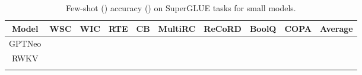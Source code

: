 \begin{table}[!h]
\small
\centering
\caption{Few-shot () accuracy () on {\sc SuperGLUE} tasks for small models.}
\label{supergluefew}
\vspace{2mm}
\setlength{\tabcolsep}{4pt}
\begin{tabular}{@{}c|ccccccccc@{}}
\toprule
Model &\multicolumn{1}{c}{{\sc WSC}} & \multicolumn{1}{c}{{\sc WIC}} & \multicolumn{1}{c}{{\sc RTE}} & \multicolumn{1}{c}{{\sc CB}} & \multicolumn{1}{c}{{\sc MultiRC}} &  \multicolumn{1}{c}{{\sc ReCoRD}} &  \multicolumn{1}{c}{{\sc BoolQ}} &  \multicolumn{1}{c}{{\sc COPA}} & \multicolumn{1}{c}{{\sc Average}} \\
\midrule 
GPTNeo \citep{gpt-neo} &  &  &  &  &  &  &  &  &  \\ 
RWKV \citep{PENG_RWKV-LM_2021} &  &  &  &  &  &  &  &  &  \\
 &  &  &  &  &  &  &  &  &  \\
\bottomrule
\end{tabular}
\end{table}


